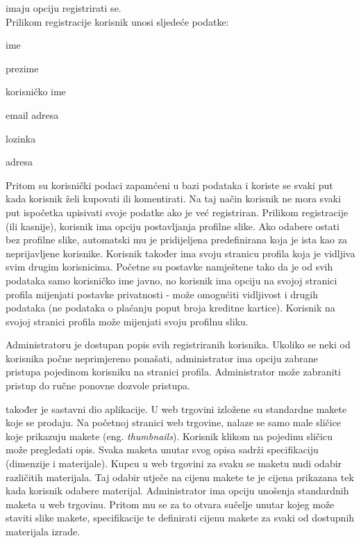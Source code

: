 		 imaju opciju registrirati se. \\Prilikom registracije korisnik unosi sljedeće podatke:
		\begin{packed_item}
			
			\item  ime
			\item  prezime
			\item  korisničko ime
			\item  email adresa
			\item  lozinka
			\item  adresa
			
		\end{packed_item}
		 Pritom su korisnički podaci zapamćeni u bazi podataka i koriste se svaki put kada korisnik želi kupovati ili komentirati. Na taj način korisnik ne mora svaki put ispočetka upisivati svoje podatke ako je već registriran. Prilikom registracije (ili kasnije), korisnik ima opciju postavljanja profilne slike. Ako odabere ostati bez profilne slike, automatski mu je pridijeljena predefinirana koja je ista kao za neprijavljene korisnike. Korisnik također ima svoju stranicu profila koja je vidljiva svim drugim korisnicima. Početne su postavke namještene tako da je od svih podataka samo korisničko ime javno, no korisnik ima opciju na svojoj stranici profila mijenjati postavke privatnosti - može omogućiti vidljivost i drugih podataka (ne podataka o plaćanju poput broja kreditne kartice). Korisnik na svojoj stranici profila može mijenjati svoju profilnu sliku.
		 
		 Administratoru je dostupan popis svih registriranih korisnika. Ukoliko se neki od korisnika počne neprimjereno ponašati, administrator ima opciju zabrane pristupa pojedinom korisniku na stranici profila. Administrator može zabraniti pristup do ručne ponovne dozvole pristupa. 
		
		 također je sastavni dio aplikacije. U web trgovini izložene su standardne makete koje se prodaju. Na početnoj stranici web trgovine, nalaze se samo male sličice koje prikazuju makete (eng. \textit{thumbnails}). Korisnik klikom na pojedinu sličicu može pregledati opis. Svaka maketa unutar svog opisa sadrži specifikaciju (dimenzije i materijale). Kupcu u web trgovini za svaku se maketu nudi odabir različitih materijala. Taj odabir utječe na cijenu makete te je cijena prikazana tek kada korisnik odabere materijal. Administrator ima opciju unošenja standardnih maketa u web trgovinu. Pritom mu se za to otvara sučelje unutar kojeg može staviti slike makete, specifikacije te definirati cijenu makete za svaki od dostupnih materijala izrade.
		
